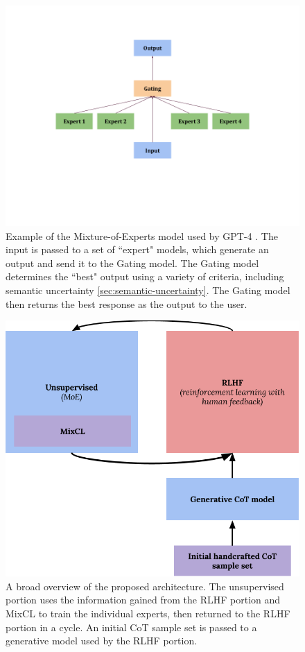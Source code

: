 \documentclass[letterpaper,12pt]{article}
\begin{document}
\begin{figure}[ht]
    \caption{Example of the Mixture-of-Experts model used by GPT-4 \cite{shazeer2017outrageously}. The input is passed to a set of ``expert" models, which generate an output and send it to the Gating model. The Gating model determines the ``best" output using a variety of criteria, including semantic uncertainty \cref{sec:semantic-uncertainty}. The Gating model then returns the best response as the output to the user.}
    \label{fig:moe}
    \includegraphics[width=12cm]{images/MoE.png}
    \centering
\end{figure}

\begin{figure}[ht]
    \caption{A broad overview of the proposed architecture. The unsupervised portion uses the information gained from the RLHF portion and MixCL to train the individual experts, then returned to the RLHF portion in a cycle. An initial CoT sample set is passed to a generative model used by the RLHF portion.}
    \label{fig:moe}
    \includegraphics[width=12cm]{images/arch.png}
    \centering
\end{figure}
\end{document}
